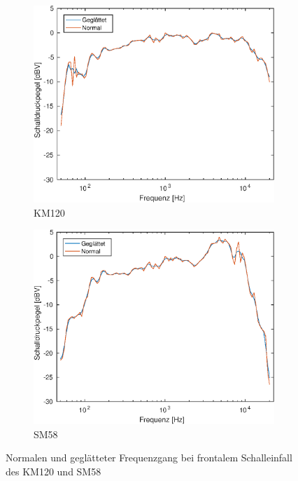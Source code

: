 \begin{figure}[bth]
    \centering
    \begin{subfigure}{.5\textwidth}
        \centering
        \caption{KM120}
        \includegraphics[width=0.95\linewidth]{Figures/km120_0_movmean}
    \end{subfigure}%
    \begin{subfigure}{.5\textwidth}
        \centering
        \caption{SM58}
        \includegraphics[width=0.95\linewidth]{Figures/sm58_0_movmean}
    \end{subfigure}
    \caption{Normalen und geglätteter Frequenzgang bei frontalem Schalleinfall des KM120 und SM58}
    \label{fig:freq_movmean}
\end{figure}

